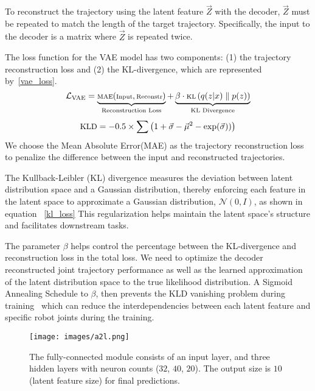 To reconstruct the trajectory using the latent feature $\vec{Z}$ with the decoder,  $\vec{Z}$ must be repeated to match the length of the target trajectory. Specifically, the input to the decoder is a matrix where $\vec{Z}$ is repeated twice.


The loss function for the VAE model has two components: (1) the trajectory reconstruction loss and (2) the KL-divergence, which are represented by~\ref{vae_loss}.
\vspace{-6pt}
\begin{equation}\label{vae_loss}
    \mathcal{L}_{\text{VAE}} = \underbrace{\scriptsize\text{MAE}(\text{Input}, \text{Reconstr})}_{\text{Reconstruction Loss}} + \underbrace{\beta \cdot \scriptsize\text{KL}\left( q(z|x) \parallel p(z) \right)}_{\text{KL Divergence}}
\end{equation}
\vspace{-1.5mm}
\begin{equation}\label{kl_loss}
\small\text{KLD} = -0.5 \times \sum \left(1 + \vec{\sigma} - \vec{\mu}^2 - \exp(\vec{\sigma})) \right)
\vspace{-4pt}
\end{equation}
We choose the Mean Absolute Error(MAE) as the trajectory reconstruction loss to penalize the difference between the input and reconstructed trajectories.


The Kullback-Leibler (KL) divergence measures the deviation between latent distribution space and a Gaussian distribution, thereby enforcing each feature in the latent space to approximate a Gaussian distribution, \( \mathcal{N}(0, I) \), as shown in equation ~\ref{kl_loss} This regularization helps maintain the latent space's structure and facilitates downstream tasks.

The parameter $\beta$ helps control the percentage between the KL-divergence and reconstruction loss in the total loss. We need to optimize the decoder reconstructed joint trajectory performance as well as the learned approximation of the latent distribution space to the true likelihood distribution. A Sigmoid Annealing Schedule to $\beta$, then prevents the KLD vanishing problem during training~\cite{fu_cyclical_2019} which can reduce the interdependencies between each latent feature and specific robot joints during the training. 
\vspace{-12pt}

\begin{figure}[h]
    \centering
    \texttt{[image: images/a2l.png]}
    \captionsetup{font=footnotesize}
    \caption{The fully-connected module consists of an input layer, and three hidden layers with neuron counts ($32$, $40$, $20$). The output size is $10$ (latent feature size) for final predictions.}
    \label{fig:feedforward}
\end{figure}

